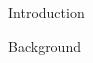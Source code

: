 \begin{section}{Introduction}
    \lipsum[1]
\end{section}

\begin{section}{Background}
    \lipsum[2]
\end{section}